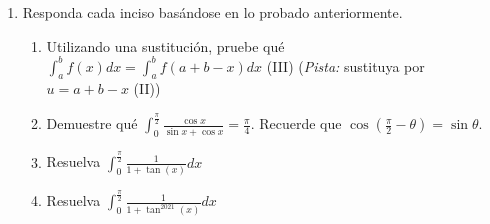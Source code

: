 \documentclass[spanish,12pt]{article}
\begin{document}
\begin{enumerate}[1)]
\begin{enumerate}
    \end{enumerate}
    \item Responda cada inciso basándose en lo probado anteriormente.
    \begin{enumerate}
        \item Utilizando una sustitución, pruebe qué $\int_a^b f(x)dx=\int_a^b f(a+b-x)dx$ (III) (\textit{Pista:} sustituya por $u=a+b-x$ (II))
        \item Demuestre qué $\int_0^{\frac{\pi}{2}}\frac{\cos x}{\sin{x}+\cos{x}}=\frac{\pi}{4}$. Recuerde que $\cos{(\frac{\pi}{2}-\theta)}=\sin{\theta}$. 
        \item Resuelva $\int_0^{\frac{\pi}{2}}\frac{1}{1+\tan(x)}dx$
        \item Resuelva $\int_0^{\frac{\pi}{2}}\frac{1}{1+\tan^{2021}(x)}dx$
    \end{enumerate}
\end{enumerate}
\end{document}
